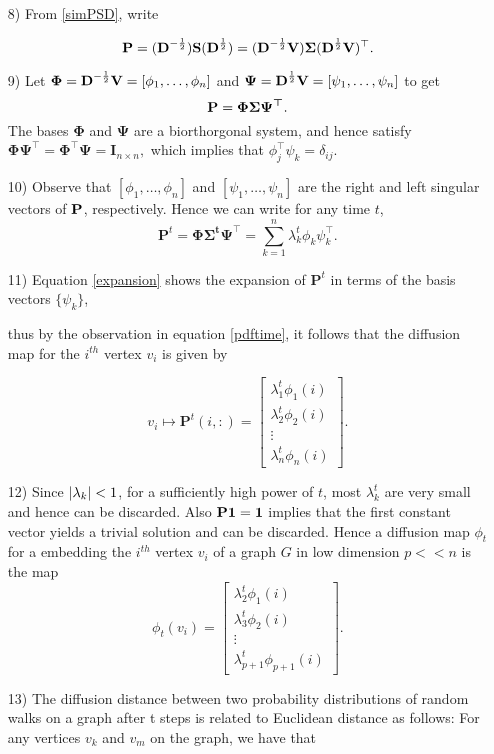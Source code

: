 \begin{itemize}
\item[8)] From \eqref{simPSD}, write 

\[\textbf{P} = (\textbf{D}^{-\frac{1}{2}}) \textbf{S} (\textbf{D}^{\frac{1}{2}} ) = 
 (\textbf{D}^{-\frac{1}{2}} \textbf{V}) \bm{\Sigma} (\textbf{D}^{\frac{1}{2}} \textbf{V} )^{\top}.
\] 
\item[9)] Let $\bm{\Phi} = \textbf{D}^{-\frac{1}{2}} \textbf{V}  = [\phi_{1}, \ldots, \phi_{n}]$ and 
$\bm{\Psi} = \textbf{D}^{\frac{1}{2}} \textbf{V} = [\psi_{1}, \ldots, \psi_{n}] $
to get  
\[\textbf{P} = \bm{\Phi \Sigma \Psi^{\top}}.
\]
The bases $\bm{\Phi}$ and $\bm{\Psi}$ are a biorthorgonal system, and hence satisfy
$ \bm{\Phi}\bm{\Psi}^{\top} =  \bm{\Phi}^{\top}\bm{\Psi}  = \bm{I}_{n \times n},$
which implies that $\phi_{j}^{\top}\psi_{k} = \delta_{ij}$.
\item[10)] Observe that  $[\phi_{1}, \ldots, \phi_{n}]$ and $[\psi_{1}, \ldots, \psi_{n}]$ are the right and left singular vectors of $\textbf{P}$, respectively.
Hence we can write for any time $t$,
\begin{equation}\label{expansion}
 \bm{P}^{t} = \bm{\Phi \Sigma^{t} \Psi^{\top}} = \displaystyle \sum_{k=1}^{n} \lambda_{k}^{t} \phi_{k} \psi_{k}^{\top}.
\end{equation} 

\item[11)] Equation \eqref{expansion} shows the expansion of $\bm{P}^{t}$ 
in terms of  the basis vectors $\{\psi_{k}\}$, 

thus by the observation in equation \eqref{pdftime}, it follows that the diffusion map for the $i^{th}$ vertex $v_{i}$ is given by

$$ v_{i} \mapsto \bm{P}^{t}(i,:) = \begin{bmatrix}
         \lambda_{1}^{t}\phi_{1}(i)\\
         \lambda_{2}^{t}\phi_{2}(i)\\
         \vdots\\
         \lambda_{n}^{t}\phi_{n}(i)
        \end{bmatrix} .$$
        
\item [12)] Since $\lvert\lambda_{k}\rvert < 1$, for a sufficiently high power of $t$,
most $\lambda_{k}^{t}$ are very small and hence can be discarded.
Also $\textbf{P}\boldsymbol{1} = \boldsymbol{1}$ implies that the first constant vector
yields a trivial solution and can be discarded.
Hence a diffusion map $\phi_{t}$ for a embedding the $i^{th}$ vertex $v_{i}$ of a graph $G$ in  low dimension $p << n$ is the map 
$$\phi_{t}(v_{i}) = \begin{bmatrix}
         \lambda_{2}^{t}\phi_{1}(i)\\
         \lambda_{3}^{t}\phi_{2}(i)\\
         \vdots\\
         \lambda_{p+1}^{t}\phi_{p+1}(i)
        \end{bmatrix} .$$
\item[13)] The diffusion distance between two probability distributions of random
walks on a graph after t steps is related to Euclidean distance as follows:
For any vertices $v_{k}$ and $v_{m}$ on the graph, we have that
\end{itemize}


